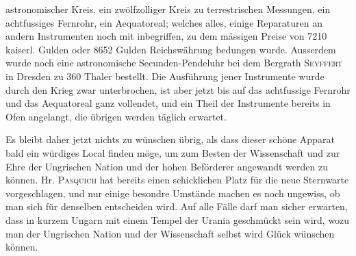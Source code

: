 {
 astronomischer Kreis, ein zwölfzolliger Kreis zu terrestrischen Messungen, ein achtfussiges Fernrohr, ein Aequatoreal; welches alles, einige Reparaturen an andern Instrumenten noch mit inbegriffen, zu dem mässigen Preise von 7210 kaiserl. Gulden oder 8652 Gulden Reichswährung bedungen wurde. Ausserdem wurde noch eine astronomische Secunden-Pendeluhr bei dem Bergrath \textsc{Seyffert} in Dresden zu 360 Thaler bestellt. Die Ausführung jener Instrumente wurde durch den Krieg zwar unterbrochen, ist aber jetzt bis auf das achtfussige Fernrohr und das Aequatoreal ganz vollendet, und ein Theil der Instrumente bereits in Ofen angelangt, die übrigen werden täglich erwartet.\par}

Es bleibt daher jetzt nichts zu wünschen übrig, als dass dieser schöne Apparat bald ein würdiges Local finden möge, um zum Besten der Wissenschaft und zur Ehre der Ungrischen Nation und der hohen Beförderer angewandt werden zu können. Hr. \textsc{Pasquich} hat bereits einen schicklichen Platz für die neue Sternwarte vorgeschlagen, und nur einige besondre Umstände machen es noch ungewiss, ob man sich für denselben entscheiden wird. Auf alle Fälle darf man sicher erwarten, dass in kurzem Ungarn mit einem Tempel der Urania geschmückt sein wird, wozu man der Ungrischen Nation und der Wissenschaft selbst wird Glück wünschen können.
